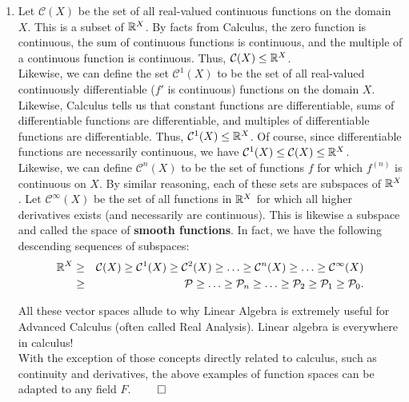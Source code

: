 \begin{Exam}
\begin{enumerate}
\item Let $\mathcal{C}(X)$ be the set of all real-valued continuous functions on the domain $X$. This is a subset of $\mathbb{R}^X$. By facts from Calculus, the zero function is continuous, the sum of continuous functions is continuous, and the multiple of a continuous function is continuous. Thus, $\mathcal{C}(X) \le \mathbb{R}^X$.\\

Likewise, we can define the set $\mathcal{C}^1(X)$ to be the set of all real-valued continuously differentiable ($f'$ is continuous) functions on the domain $X$. Likewise, Calculus tells us that constant functions are  differentiable, sums of differentiable functions are differentiable, and multiples of differentiable functions are differentiable. Thus, $\mathcal{C}^1(X) \le \mathbb{R}^{X}$. Of course, since differentiable functions are necessarily continuous, we have $\mathcal{C}^1(X) \le \mathcal{C}(X) \le \mathbb{R}^X$. \\

Likewise, we can define $\mathcal{C}^n(X)$ to be the set of functions $f$ for which $f^{(n)}$ is continuous on $X$. By similar reasoning, each of these sets are subspaces of $\mathbb{R}^X$. Let $\mathcal{C}^\infty(X)$ be the set of all functions in $\mathbb{R}^X$ for which all higher derivatives exists (and necessarily are continuous). This is likewise a subspace and called the space of \textbf{smooth functions}. In fact, we have the following descending sequences of subspaces:
\begin{eqnarray*}
\mathbb{R}^X &\ge& \mathcal{C}(X) \ge \mathcal{C}^1(X) \ge \mathcal{C}^2(X) \ge \ldots \ge \mathcal{C}^n(X) \ge \ldots \ge \mathcal{C}^{\infty}(X)\\
&\ge& \mathcal{P} \ge \ldots \ge \mathcal{P}_n \ge \ldots \ge \mathcal{P}_2 \ge \mathcal{P}_1 \ge \mathcal{P}_0.
\end{eqnarray*}

All these vector spaces allude to why Linear Algebra is extremely useful for Advanced Calculus (often called Real Analysis). Linear algebra is everywhere in calculus!\\

With the exception of those concepts directly related to calculus, such as continuity and derivatives, the above examples of function spaces can be adapted to any field $F$. \hfill$\qedhere$

\end{enumerate}
\end{Exam}\vs

